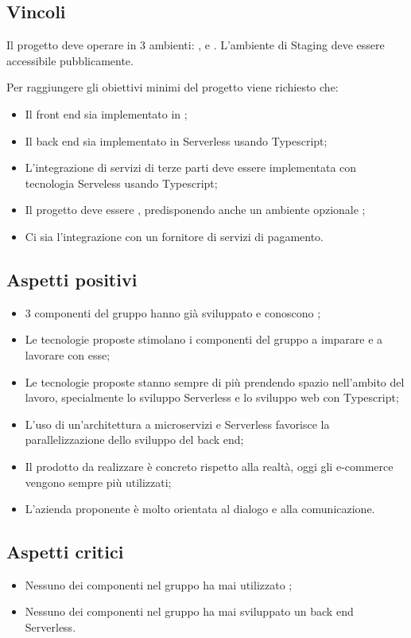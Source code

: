 \subsection{Vincoli}
Il progetto deve operare in 3 ambienti: ,  e . L'ambiente di Staging deve essere accessibile pubblicamente.

Per raggiungere gli obiettivi minimi del progetto viene richiesto che:
\begin{itemize}
	\item Il front end sia implementato in ;
	\item Il back end sia implementato in Serverless usando Typescript;
	\item L'integrazione di servizi di terze parti deve essere implementata con tecnologia Serveless usando Typescript;
	\item Il progetto deve essere , predisponendo anche un ambiente opzionale ;
	\item Ci sia l'integrazione con un fornitore di servizi di pagamento.
\end{itemize}

\subsection{Aspetti positivi}
\begin{itemize}
	\item 3 componenti del gruppo hanno già sviluppato e conoscono ;
	\item Le tecnologie proposte stimolano i componenti del gruppo a imparare e a lavorare con esse;
	\item Le tecnologie proposte stanno sempre di più prendendo spazio nell'ambito del lavoro, specialmente lo sviluppo Serverless e lo sviluppo web con Typescript;
	\item L'uso di un'architettura a microservizi e Serverless favorisce la parallelizzazione dello sviluppo del back end;
	\item Il prodotto da realizzare è concreto rispetto alla realtà, oggi gli e-commerce vengono sempre più utilizzati;
	\item L'azienda proponente è molto orientata al dialogo e alla comunicazione.
\end{itemize}

\subsection{Aspetti critici}
\begin{itemize}
	\item Nessuno dei componenti nel gruppo ha mai utilizzato ;
	\item Nessuno dei componenti nel gruppo ha mai sviluppato un back end Serverless.
\end{itemize}

